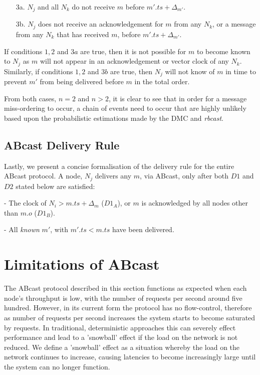         \begin{itemize}
            \item[3a.] $N_j$ and all $N_k$ do not receive $m$ before $m'.ts + \Delta_{m'}$.
            
            \item[3b.] $N_j$ does not receive an acknowledgement for $m$ from any $N_k$, or a message from any $N_k$ that has received $m$, before $m'.ts + \Delta_{m'}$.  
        \end{itemize}
        
        If conditions $1,2$ and $3a$ are true, then it is not possible for $m$ to become known to $N_j$ as $m$ will not appear in an acknowledgement or vector clock of any $N_k$.  Similarly, if conditions $1,2$ and $3b$ are true, then $N_j$ will not know of $m$ in time to prevent $m'$ from being delivered before $m$ in the total order.  
        
        From both cases, $n=2$ and $n>2$, it is clear to see that in order for a message miss-ordering to occur, a chain of events need to occur that are highly unlikely based upon the probabilistic estimations made by the DMC and \emph{rbcast}.  
        		
    \subsection{ABcast Delivery Rule}
    Lastly, we present a concise formalisation of the delivery rule for the entire \textsf{ABcast} protocol.  A node, $N_j$ delivers any $m$, via \textsf{ABcast}, only after both $D1$ and $D2$ stated below are satisfied:
	    \begin{description}[labelindent=1cm]
	        \item[$\boldsymbol{D1}$] - The clock of $N_i > m.ts + \Delta_{m}$ ($D1_A$), or $m$ is acknowledged by all nodes other than $m.o$ ($D1_B$). 
	        \item[$\boldsymbol{D2}$] - All \emph{known} $m'$, with $m'.ts < m.ts$ have been delivered.
	    \end{description}
	    
\section{Limitations of ABcast}
The \textsf{ABcast} protocol described in this section functions as expected when each node's throughput is low, with the number of requests per second around five hundred.  However, in its current form the protocol has no flow-control, therefore as number of requests per second increases the system starts to become saturated by requests.  In traditional, deterministic approaches this can severely effect performance and lead to a 'snowball' effect if the load on the network is not reduced.  We define a 'snowball' effect as a situation whereby the load on the network continues to increase, causing latencies to become increasingly large until the system can no longer function.  

